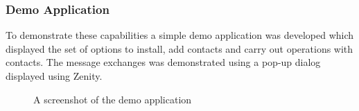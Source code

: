 

\subsubsection{Demo Application}
To demonstrate these capabilities a simple demo application was developed which displayed the set of options to install, add contacts and carry out operations with contacts. The message exchanges was demonstrated using a pop-up dialog displayed using Zenity\cite{zenity}.

\begin{center}
\begin{figure}[here]
\caption{A screenshot of the demo application}
\label{fig:fig2}
\end{figure}
\end{center}
